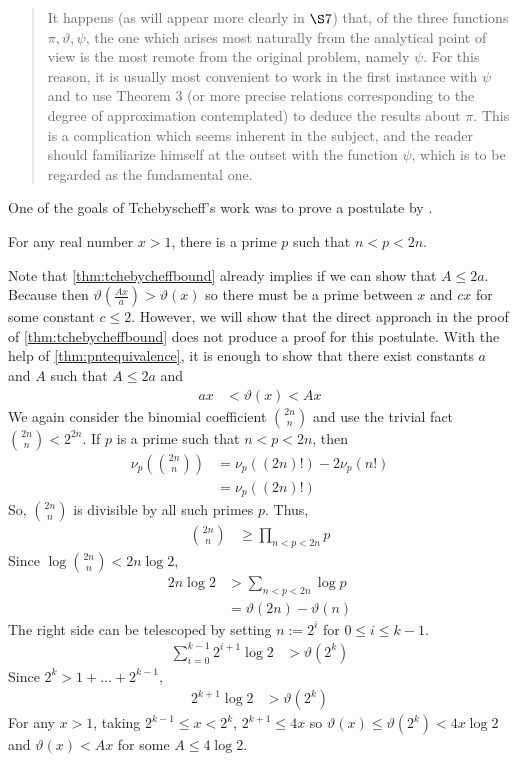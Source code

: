 \documentclass[elemannt.tex]{subfile}
\begin{document}
		\begin{quote}
			It happens (as will appear more clearly in $\S7$) that, of the three functions $\pi,\vartheta,\psi$, the one which arises most naturally from the analytical point of view is the most remote from the original problem, namely $\psi$. For this reason, it is usually most convenient to work in the first instance with $\psi$ and to use Theorem 3 (or more precise relations corresponding to the degree of approximation contemplated) to deduce the results about $\pi$. This is a complication which seems inherent in the subject, and the reader should familiarize himself at the outset with the function $\psi$, which is to be regarded as the fundamental one.
		\end{quote}
	One of the goals of Tchebyscheff's work was to prove a postulate by \textcite{bertrand_1845}.
		\begin{conjecture}\label{con:bertrand}
			For any real number $x>1$, there is a prime $p$ such that $n<p<2n$.
		\end{conjecture}
	Note that \autoref{thm:tchebycheffbound} already implies  if we can show that $A\leq 2a$. Because then $\vartheta\left(\frac{Ax}{a}\right)>\vartheta(x)$ so there must be a prime between $x$ and $cx$ for some constant $c\leq 2$. However, we will show that the direct approach in the proof of \autoref{thm:tchebycheffbound} does not produce a proof for this postulate.
			With the help of \autoref{thm:pntequivalence}, it is enough to show that there exist constants $a$ and $A$ such that $A\leq 2a$ and
				\begin{align*}
					ax
					& < \vartheta(x) < Ax
				\end{align*}
			We again consider the binomial coefficient $\binom{2n}{n}$ and use the trivial fact $\binom{2n}{n}<2^{2n}$. If $p$ is a prime such that $n<p<2n$, then
				\begin{align*}
					\nu_{p}\left(\binom{2n}{n}\right)
						& = \nu_{p}((2n)!)-2\nu_{p}(n!)\\
						& = \nu_{p}((2n)!)
				\end{align*}
			So, $\binom{2n}{n}$ is divisible by all such primes $p$. Thus,
				\begin{align*}
					\binom{2n}{n}
						& \geq \prod_{n<p<2n}p
				\end{align*}
			Since $\log{\binom{2n}{n}}<2n\log{2}$,
				\begin{align*}
					2n\log{2}
						& > \sum_{n<p<2n}\log{p}\\
						& = \vartheta(2n)-\vartheta(n)
				\end{align*}
			The right side can be telescoped by setting $n:=2^{i}$ for $0\leq i\leq  k-1$.
				\begin{align*}
					\sum_{i=0}^{k-1}2^{i+1}\log{2}
						& > \vartheta(2^{k})
				\end{align*}
			Since $2^{k}>1+\ldots+2^{k-1}$,
				\begin{align*}
					2^{k+1}\log{2}
						& > \vartheta(2^{k})
				\end{align*}
			For any $x>1$, taking $2^{k-1}\leq x<2^{k}$, $2^{k+1}\leq 4x$ so $\vartheta(x)\leq\vartheta(2^{k})<4x\log{2}$ and $\vartheta(x)<Ax$ for some $A\leq 4\log{2}$.
\end{document}
